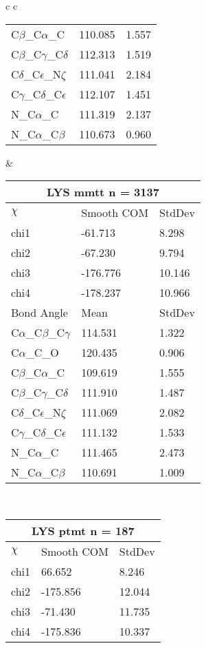 \begin{longtable}{ c c }
\begin{tabular}{ l l l }
  C$\beta$\_C$\alpha$\_C & 110.085 & 1.557\\
  C$\beta$\_C$\gamma$\_C$\delta$ & 112.313 & 1.519\\
  C$\delta$\_C$\epsilon$\_N$\zeta$ & 111.041 & 2.184\\
  C$\gamma$\_C$\delta$\_C$\epsilon$ & 112.107 & 1.451\\
  N\_C$\alpha$\_C & 111.319 & 2.137\\
  N\_C$\alpha$\_C$\beta$ & 110.673 & 0.960\\
  \bottomrule
  \end{tabular}
  &
  \begin{tabular}{ l l l }
  \toprule
  \multicolumn{3}{c}{LYS \textbf{mmtt} n = 3137} \\ \toprule
  $\chi$       & Smooth COM & StdDev \\ \midrule
  chi1 & -61.713 & 8.298 \\ 
  chi2 & -67.230 & 9.794 \\ 
  chi3 & -176.776 & 10.146 \\ 
  chi4 & -178.237 & 10.966 \\ \midrule
  Bond Angle   & Mean     & StdDev \\ \midrule
  C$\alpha$\_C$\beta$\_C$\gamma$ & 114.531 & 1.322\\
  C$\alpha$\_C\_O & 120.435 & 0.906\\
  C$\beta$\_C$\alpha$\_C & 109.619 & 1.555\\
  C$\beta$\_C$\gamma$\_C$\delta$ & 111.910 & 1.487\\
  C$\delta$\_C$\epsilon$\_N$\zeta$ & 111.069 & 2.082\\
  C$\gamma$\_C$\delta$\_C$\epsilon$ & 111.132 & 1.533\\
  N\_C$\alpha$\_C & 111.465 & 2.473\\
  N\_C$\alpha$\_C$\beta$ & 110.691 & 1.009\\
  \bottomrule
  \end{tabular}
  \\
  \begin{tabular}{ l l l }
  \toprule
  \multicolumn{3}{c}{LYS \textbf{ptmt} n = 187} \\ \toprule
  $\chi$       & Smooth COM & StdDev \\ \midrule
  chi1 & 66.652 & 8.246 \\ 
  chi2 & -175.856 & 12.044 \\ 
  chi3 & -71.430 & 11.735 \\ 
  chi4 & -175.836 & 10.337 \\ \midrule

\end{tabular}
\end{longtable}
